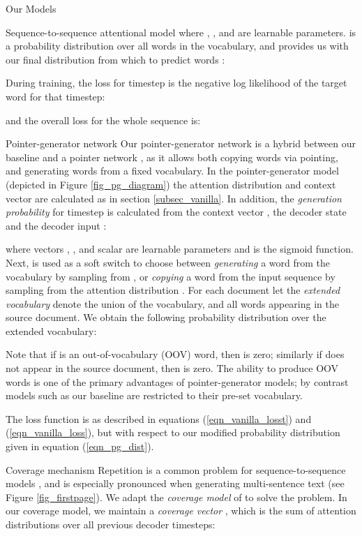 \documentclass[11pt,a4paper]{article}
\begin{document}
\begin{section}{Our Models}
\begin{subsection}{Sequence-to-sequence attentional model}
where , ,  and  are learnable parameters.
 is a probability distribution over all words in the vocabulary, and provides us with our final distribution from which to predict words :

During training, the loss for timestep  is the negative log likelihood of the target word  for that timestep:

and the overall loss for the whole sequence is:

\end{subsection}

\begin{subsection}{Pointer-generator network}
Our pointer-generator network is a hybrid between our baseline and a pointer network \cite{vinyals2015pointer}, as it allows both copying words via pointing, and generating words from a fixed vocabulary.
In the pointer-generator model (depicted in Figure \ref{fig_pg_diagram}) the attention distribution  and context vector  are calculated as in section \ref{subsec_vanilla}.
In addition, the \textit{generation probability}  for timestep  is calculated from the context vector , the decoder state  and the decoder input :

where vectors , ,  and scalar  are learnable parameters and  is the sigmoid function.
Next,  is used as a soft switch to choose between \textit{generating} a word from the vocabulary by sampling from , or \textit{copying} a word from the input sequence by sampling from the attention distribution .
For each document let the \textit{extended vocabulary} denote the union of the vocabulary, and all words appearing in the source document.
We obtain the following probability distribution over the extended vocabulary:

Note that if  is an out-of-vocabulary (OOV) word, then  is zero;
similarly if  does not appear in the source document, then  is zero.
The ability to produce OOV words is one of the primary advantages of pointer-generator models; by contrast models such as our baseline are restricted to their pre-set vocabulary.

The loss function is as described in equations (\ref{eqn_vanilla_losst}) and (\ref{eqn_vanilla_loss}), but with respect to our modified probability distribution  given in equation (\ref{eqn_pg_dist}).
\end{subsection}

\begin{subsection}{Coverage mechanism}
Repetition is a common problem for sequence-to-sequence models \cite{tu2016modeling, mi2016coverage, sankaran2016temporal, suzuki2016rnn}, and is especially pronounced when generating multi-sentence text (see Figure \ref{fig_firstpage}).
We adapt the \textit{coverage model} of \citeauthor{tu2016modeling}   to solve the problem.
In our coverage model, we maintain a \textit{coverage vector} , which is the sum of attention distributions over all previous decoder timesteps:


\end{subsection}
\end{section}
\end{document}
